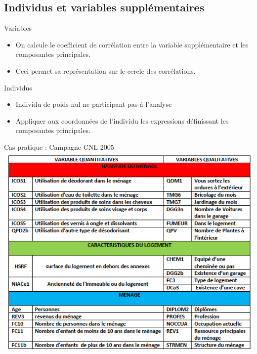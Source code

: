 \documentclass[10pt]{beamer}
\begin{document}
\subsection{Individus et variables supplémentaires }



\begin{frame}{ Variables }

 \begin{itemize}
 \item   On calcule le coefficient de corrélation entre la variable supplémentaire et les composantes principales. 
 
 \item Ceci permet sa représentation sur le cercle des corrélations.
 
 \end{itemize}


\end{frame}


 

\begin{frame}{ Individus }

 \begin{itemize}
 \item   Individu de poids nul ne participant pas à l’analyse  
 
\item Appliquer aux coordonnées de l’individu les expressions
définissant les composantes principales.
 \end{itemize}


\end{frame}


\begin{frame}{ Cas pratique : Campagne CNL 2005}
\centering 
\includegraphics[scale=0.5]{CNL1} 

\end{frame}
\end{document}

